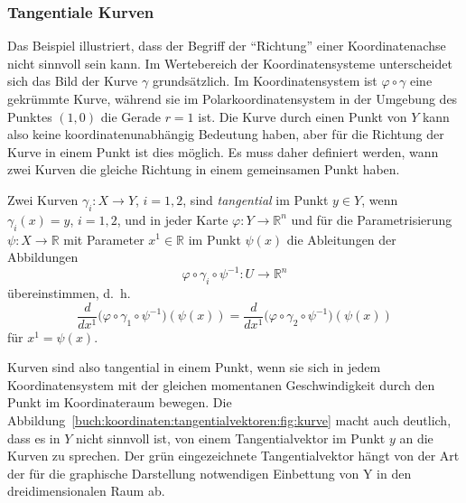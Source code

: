


\subsubsection{Tangentiale Kurven}
Das Beispiel illustriert, dass der Begriff der ``Richtung'' einer
Koordinatenachse nicht sinnvoll sein kann.
Im Wertebereich der Koordinatensysteme unterscheidet sich das Bild
der Kurve $\gamma$ grundsätzlich.
Im Koordinatensystem ist $\varphi\circ\gamma$ eine gekrümmte Kurve,
während sie im Polarkoordinatensystem in der Umgebung des Punktes
$(1,0)$ die Gerade $r=1$ ist.
Die Kurve durch einen Punkt von $Y$ kann also keine koordinatenunabhängig
Bedeutung haben, aber für die Richtung der Kurve in einem Punkt ist
dies möglich.
Es muss daher definiert werden, wann zwei Kurven die gleiche Richtung
in einem gemeinsamen Punkt haben.


%

\begin{definition}
Zwei Kurven $\gamma_i\colon X\to Y$, $i=1,2$, sind
{\em tangential} im Punkt $y\in Y$, wenn
$\gamma_i(x) = y$, $i=1,2$, und
in jeder Karte
$\varphi\colon Y\to\mathbb{R}^n$ und für die Parametrisierung
$\psi\colon X\to \mathbb{R}$ mit Parameter $x^1\in\mathbb{R}$ 
im Punkt $\psi(x)$ die Ableitungen der Abbildungen
\[
\varphi
\circ
\gamma_i
\circ
\psi^{-1}
\colon
U\to\mathbb{R}^n
\]
übereinstimmen, d.~h.
\begin{equation}
\frac{d}{dx^1}
\bigl(\varphi\circ\gamma_1\circ\psi^{-1}\bigr)(\psi(x))
=
\frac{d}{dx^1}
\bigl(\varphi\circ\gamma_2\circ\psi^{-1}\bigr)(\psi(x))
\label{buch:koordinaten:tangentialvektoren:eqn:tangential}
\end{equation}
für $x^1=\psi(x)$.
\end{definition}

Kurven sind also tangential in einem Punkt, wenn sie sich in jedem
Koordinatensystem mit der gleichen momentanen Geschwindigkeit
durch den Punkt im Koordinateraum bewegen.
Die Abbildung~\ref{buch:koordinaten:tangentialvektoren:fig:kurve}
macht auch deutlich, dass es in $Y$ nicht sinnvoll ist, von einem
Tangentialvektor im Punkt $y$ an die Kurven zu sprechen.
Der grün eingezeichnete Tangentialvektor hängt von der Art der
für die graphische Darstellung notwendigen Einbettung von Y in
den dreidimensionalen Raum ab.

%
%
